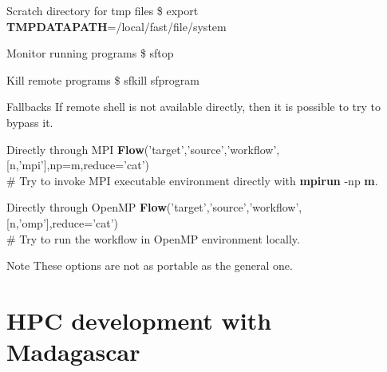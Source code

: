 \begin{frame}
  \begin{block}{Scratch directory for tmp files}
    \$ export {\bf TMPDATAPATH}=/local/fast/file/system
  \end{block}
  \begin{block}{Monitor running programs}
    \$ sftop
  \end{block}
  \begin{block}{Kill remote programs}
    \$ sfkill sfprogram
  \end{block}
\end{frame}

\begin{frame}
  \begin{block}{Fallbacks}
    If remote shell is not available directly, then it is possible to try to
    bypass it.
  \end{block}
  \begin{block}{Directly through MPI}
    {\bf Flow}('target','source','workflow',[n,'mpi'],np=m,reduce='cat') \\
    \# Try to invoke MPI executable environment directly with {\bf mpirun} -np
    {\bf m}.
  \end{block}
  \begin{block}{Directly through OpenMP}
    {\bf Flow}('target','source','workflow',[n,'omp'],reduce='cat') \\
    \# Try to run the workflow in OpenMP environment locally.
  \end{block}
  \begin{block}{Note}
    These options are not as portable as the general one.
  \end{block}
\end{frame}

\section{HPC development with Madagascar}

